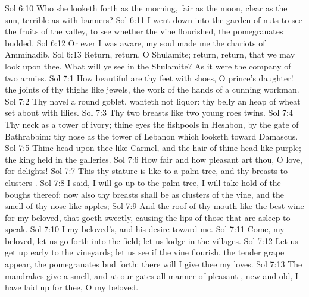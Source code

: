 \vs Sol 6:10 Who  she  looketh forth as the morning, fair as the moon, clear as the sun,  terrible as  with banners?
\vs Sol 6:11 I went down into the garden of nuts to see the fruits of the valley,  to see whether the vine flourished,  the pomegranates budded.
\vs Sol 6:12 Or ever I was aware, my soul made me  the chariots of Amminadib.
\vs Sol 6:13 Return, return, O Shulamite; return, return, that we may look upon thee. What will ye see in the Shulamite? As it were the company of two armies.
\vs Sol 7:1 How beautiful are thy feet with shoes, O prince's daughter! the joints of thy thighs  like jewels, the work of the hands of a cunning workman.
\vs Sol 7:2 Thy navel  a round goblet,  wanteth not liquor: thy belly  an heap of wheat set about with lilies.
\vs Sol 7:3 Thy two breasts  like two young roes  twins.
\vs Sol 7:4 Thy neck  as a tower of ivory; thine eyes  the fishpools in Heshbon, by the gate of Bathrabbim: thy nose  as the tower of Lebanon which looketh toward Damascus.
\vs Sol 7:5 Thine head upon thee  like Carmel, and the hair of thine head like purple; the king  held in the galleries.
\vs Sol 7:6 How fair and how pleasant art thou, O love, for delights!
\vs Sol 7:7 This thy stature is like to a palm tree, and thy breasts to clusters .
\vs Sol 7:8 I said, I will go up to the palm tree, I will take hold of the boughs thereof: now also thy breasts shall be as clusters of the vine, and the smell of thy nose like apples;
\vs Sol 7:9 And the roof of thy mouth like the best wine for my beloved, that goeth  sweetly, causing the lips of those that are asleep to speak.
\vs Sol 7:10 I  my beloved's, and his desire  toward me.
\vs Sol 7:11 Come, my beloved, let us go forth into the field; let us lodge in the villages.
\vs Sol 7:12 Let us get up early to the vineyards; let us see if the vine flourish,  the tender grape appear,  the pomegranates bud forth: there will I give thee my loves.
\vs Sol 7:13 The mandrakes give a smell, and at our gates  all manner of pleasant , new and old,  I have laid up for thee, O my beloved.
